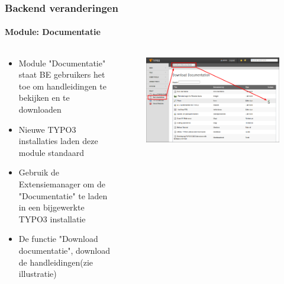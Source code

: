 \begin{frame}[fragile]
	\frametitle{Backend veranderingen}
	\framesubtitle{Module: Documentatie}

	\begin{columns}[T]

		\begin{column}{.5\textwidth}
			\begin{itemize}
				\item Module "Documentatie" staat BE gebruikers het toe om handleidingen te bekijken en te downloaden
				\item Nieuwe TYPO3 installaties laden deze module standaard
				\item Gebruik de Extensiemanager om de "Documentatie" te laden in een bijgewerkte TYPO3 installatie 
				\item De functie "Download documentatie", download de handleidingen(zie illustratie)
			\end{itemize}
		\end{column}

		\begin{column}{.5\textwidth}
			\begin{figure}\vspace*{-0.4cm}
				\includegraphics[width=1\linewidth]{Images/BackendChanges/DownloadDocumentation.png}
			\end{figure}
		\end{column}

	\end{columns}

\end{frame}


